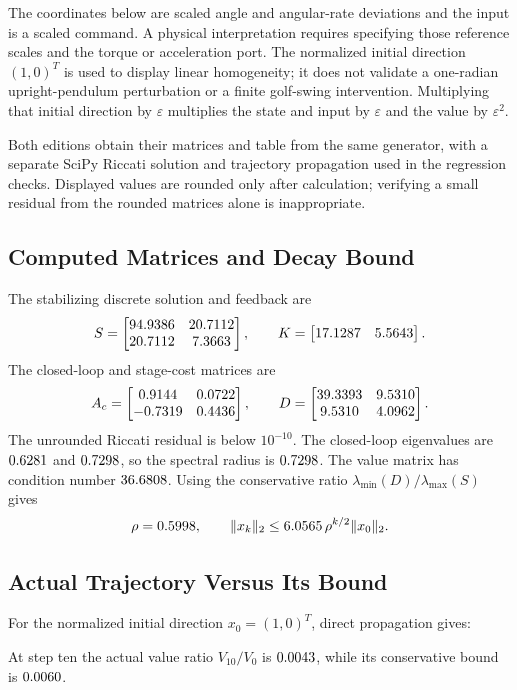 The coordinates below are scaled angle and angular-rate deviations and the input is a scaled command. A physical interpretation requires specifying those reference scales and the torque or acceleration port. The normalized initial direction $(1,0)^T$ is used to display linear homogeneity; it does not validate a one-radian upright-pendulum perturbation or a finite golf-swing intervention. Multiplying that initial direction by $\varepsilon$ multiplies the state and input by $\varepsilon$ and the value by $\varepsilon^2$.

Both editions obtain their matrices and table from the same generator, with a separate SciPy Riccati solution and trajectory propagation used in the regression checks. Displayed values are rounded only after calculation; verifying a small residual from the rounded matrices alone is inappropriate.


\subsection{Computed Matrices and Decay Bound}
The stabilizing discrete solution and feedback are
\begin{equation}
S=\begin{bmatrix}94.9386 & 20.7112 \\ 20.7112 & 7.3663\end{bmatrix},\qquad
K=\begin{bmatrix}17.1287 & 5.5643\end{bmatrix}.
\end{equation}
The closed-loop and stage-cost matrices are
\begin{equation}
A_c=\begin{bmatrix}0.9144 & 0.0722 \\ -0.7319 & 0.4436\end{bmatrix},\qquad
D=\begin{bmatrix}39.3393 & 9.5310 \\ 9.5310 & 4.0962\end{bmatrix}.
\end{equation}
The unrounded Riccati residual is below $10^{-10}$. The closed-loop eigenvalues
are $0.6281$ and $0.7298$, so the spectral radius is
$0.7298$. The value matrix has condition number $36.6808$.
Using the conservative ratio $\lambda_{\min}(D)/\lambda_{\max}(S)$ gives
\begin{equation}
\rho=0.5998,\qquad
\|x_k\|_2\le6.0565\,\rho^{k/2}\|x_0\|_2.
\end{equation}
\subsection{Actual Trajectory Versus Its Bound}
For the normalized initial direction $x_0=(1,0)^T$, direct propagation gives:
\begin{center}
\small
\chsixValueTable
\end{center}
At step ten the actual value ratio $V_{10}/V_0$ is $0.0043$,
while its conservative bound is $0.0060$.


